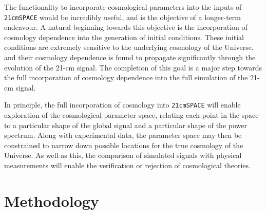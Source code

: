 \documentclass[floats,floatfix,showpacs,amssymb,prd,superscriptaddress,nofootinbib]{revtex4-2} %
\newcommand{\code}{\texttt}
\begin{document}

The functionality to incorporate cosmological parameters into the inputs of \code{21cmSPACE} would be incredibly useful, and is the objective of a longer-term endeavour. A natural beginning towards this objective is the incorporation of cosmology dependence into the generation of initial conditions. These initial conditions are extremely sensitive to the underlying cosmology of the Universe, and their cosmology dependence is found to propagate significantly through the evolution of the 21-cm signal. The completion of this goal is a major step towards the full incorporation of cosmology dependence into the full simulation of the 21-cm signal.


In principle, the full incorporation of cosmology into \code{21cmSPACE} will enable exploration of the cosmological parameter space, relating each point in the space to a particular shape of the global signal and a particular shape of the power spectrum. Along with experimental data, the parameter space may then be constrained to narrow down possible locations for the true cosmology of the Universe. As well as this, the comparison of simulated signals with physical measurements will enable the verification or rejection of cosmological theories.




\newpage
\section{Methodology}
\end{document}
